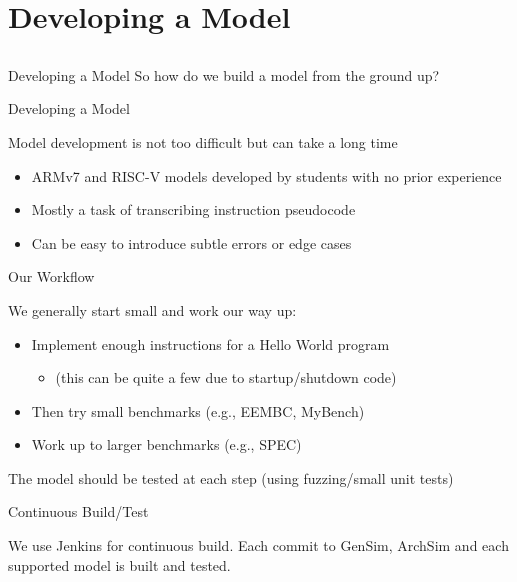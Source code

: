 \section{Developing a Model}
\subsection{}

\begin{frame}{Developing a Model}
So how do we build a model from the ground up?
\end{frame}

\begin{frame}{Developing a Model}

Model development is not too difficult but can take a long time

\begin{itemize}
\item ARMv7 and RISC-V models developed by students with no prior experience
\item Mostly a task of transcribing instruction pseudocode
\item Can be easy to introduce subtle errors or edge cases
\end{itemize}

\end{frame}

\begin{frame}{Our Workflow}

We generally start small and work our way up:
\begin{itemize}
\item Implement enough instructions for a Hello World program
\begin{itemize}
\item (this can be quite a few due to startup/shutdown code)
\end{itemize}
\item Then try small benchmarks (e.g., EEMBC, MyBench)
\item Work up to larger benchmarks (e.g., SPEC)
\end{itemize}

The model should be tested at each step (using fuzzing/small unit tests)

\end{frame}

\begin{frame}{Continuous Build/Test}

We use Jenkins for continuous build. Each commit to GenSim, ArchSim and 
each supported model is built and tested.


\end{frame}

